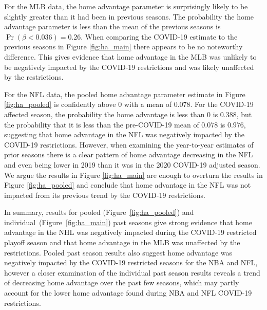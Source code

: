 For the MLB data, the home advantage parameter is surprisingly likely to be slightly greater than it had been in previous seasons. The probability the home advantage parameter is less than the mean of the previous seasons is $\Pr(\beta < 0.036) = 0.26$. When comparing the COVID-19 estimate to the previous seasons in Figure \mbox{\ref{fig:ha_main}} there appears to be no noteworthy difference. This gives evidence that home advantage in the MLB was unlikely to be negatively impacted by the COVID-19 restrictions and was likely unaffected by the restrictions.

For the NFL data, the pooled home advantage parameter estimate in Figure \mbox{\ref{fig:ha_pooled}} is confidently above 0 with a mean of 0.078. For the COVID-19 affected season, the probability the home advantage is less than 0 is $0.388$, but the probability that it is less than the pre-COVID-19 mean of 0.078 is $0.976$, suggesting that home advantage in the NFL was negatively impacted by the COVID-19 restrictions. However, when examining the year-to-year estimates of prior seasons there is a clear pattern of home advantage decreasing in the NFL and even being lower in 2019 than it was in the 2020 COVID-19 adjusted season. We argue the results in Figure \mbox{\ref{fig:ha_main}} are enough to overturn the results in Figure \mbox{\ref{fig:ha_pooled}} and conclude that home advantage in the NFL was not impacted from its previous trend by the COVID-19 restrictions.

In summary, results for pooled (Figure~\mbox{\ref{fig:ha_pooled}}) and individual~(Figure~\mbox{\ref{fig:ha_main}}) past seasons give strong evidence that home advantage in the NHL was negatively impacted during the COVID-19 restricted playoff season and that home advantage in the MLB was unaffected by the restrictions. Pooled past season results also suggest home advantage was negatively impacted by the COVID-19 restricted seasons for the NBA and NFL, however a closer examination of the individual past season results reveals a trend of decreasing home advantage over the past few seasons, which may partly account for the lower home advantage found during NBA and NFL COVID-19 restrictions.

